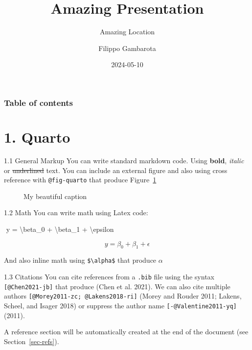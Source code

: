 \documentclass[
  ignorenonframetext,
]{beamer}
\title{Amazing Presentation}
\subtitle{Amazing Location}
\author{Filippo Gambarota}
\date{2024-05-10}
\institute{University of Padova}
\newenvironment{Shaded}{\begin{snugshade}}{\end{snugshade}}
\newcommand{\SpecialCharTok}[1]{\textcolor[rgb]{0.37,0.37,0.37}{#1}}
\newcommand{\SpecialStringTok}[1]{\textcolor[rgb]{0.13,0.47,0.30}{#1}}
\renewcommand*\contentsname{Table of contents}
\newcommand\contentsname{Table of contents}
\begin{document}
\frame{\titlepage}

\renewcommand*\contentsname{Table of contents}
\begin{frame}[allowframebreaks]
  \frametitle{Table of contents}
  \tableofcontents[hideallsubsections]
\end{frame}

\section{1. Quarto}\label{quarto}

\begin{frame}[fragile]{1.1 General Markup}
\label{general-markup}
You can write standard markdown code. Using \textbf{bold}, \emph{italic}
or \st{underlined} text. You can include an external figure and also
using cross reference with \texttt{@fig-quarto} that produce
Figure~\ref{fig-quarto}

\begin{figure}

\centering{



}

\caption{\label{fig-quarto}My beautiful caption}

\end{figure}%
\end{frame}

\begin{frame}[fragile]{1.2 Math}
\label{math}
You can write math using Latex code:

\begin{Shaded}
\begin{Highlighting}[]
\SpecialStringTok{$$}
\SpecialStringTok{y = }\SpecialCharTok{\textbackslash{}beta}\SpecialStringTok{\_0 + }\SpecialCharTok{\textbackslash{}beta}\SpecialStringTok{\_1 + }\SpecialCharTok{\textbackslash{}epsilon}
\SpecialStringTok{$$}
\end{Highlighting}
\end{Shaded}

\[
y = \beta_0 + \beta_1 + \epsilon
\]

And also inline math using \texttt{\$\textbackslash{}alpha\$} that
produce \(\alpha\)
\end{frame}

\begin{frame}[fragile]{1.3 Citations}
\label{sec-citations}
You can cite references from a \texttt{.bib} file using the syntax
\texttt{{[}@Chen2021-jb{]}} that produce (Chen et al. 2021). We can also
cite multiple authors \texttt{{[}@Morey2011-zc;\ @Lakens2018-ri{]}}
(Morey and Rouder 2011; Lakens, Scheel, and Isager 2018) or suppress the
author name \texttt{{[}-@Valentine2011-yq{]}} (2011).

A reference section will be automatically created at the end of the
document (see Section~\ref{sec-refs}).
\end{frame}
\end{document}
